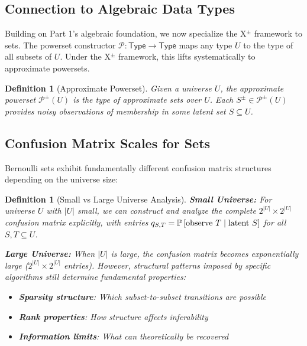\documentclass[11pt,final,hidelinks]{article}
\newtheorem{definition}[theorem]{Definition}
\begin{document}
\subsection{Connection to Algebraic Data Types}

Building on Part 1's algebraic foundation, we now specialize the X$^{\pm}$ framework to sets. The powerset constructor $\mathcal{P}: \mathsf{Type} \to \mathsf{Type}$ maps any type $U$ to the type of all subsets of $U$. Under the X$^{\pm}$ framework, this lifts systematically to approximate powersets.

\begin{definition}[Approximate Powerset]
Given a universe $U$, the \emph{approximate powerset} $\mathcal{P}^{\pm}(U)$ is the type of approximate sets over $U$. Each $S^{\pm} \in \mathcal{P}^{\pm}(U)$ provides noisy observations of membership in some latent set $S \subseteq U$.
\end{definition}

\subsection{Confusion Matrix Scales for Sets}

Bernoulli sets exhibit fundamentally different confusion matrix structures depending on the universe size:

\begin{definition}[Small vs Large Universe Analysis]
\textbf{Small Universe:} For universe $U$ with $|U|$ small, we can construct and analyze the complete $2^{|U|} \times 2^{|U|}$ confusion matrix explicitly, with entries $q_{S,T} = \mathbb{P}\left[\text{observe } T \mid \text{latent } S\right]$ for all $S, T \subseteq U$.

\textbf{Large Universe:} When $|U|$ is large, the confusion matrix becomes exponentially large ($2^{|U|} \times 2^{|U|}$ entries). However, \emph{structural patterns} imposed by specific algorithms still determine fundamental properties:
\begin{itemize}
    \item \textbf{Sparsity structure}: Which subset-to-subset transitions are possible
    \item \textbf{Rank properties}: How structure affects inferability
    \item \textbf{Information limits}: What can theoretically be recovered
\end{itemize}
\end{definition}
\end{document}
